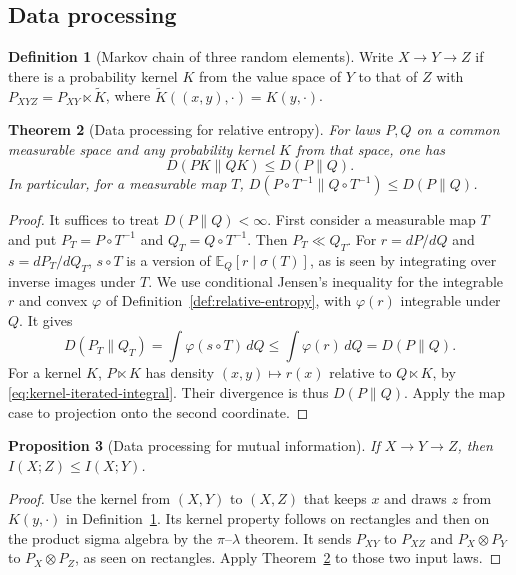 \documentclass[11pt,oneside]{book}
\newtheorem{theorem}{Theorem}[chapter]
\newtheorem{proposition}[theorem]{Proposition}
\theoremstyle{definition}
\newtheorem{definition}[theorem]{Definition}
\theoremstyle{remark}
\begin{document}
\subsection{Data processing}
\label{subsec:information-data-processing}

\begin{definition}[Markov chain of three random elements]
\label{def:markov-chain-three}
Write $X\to Y\to Z$ if there is a probability kernel $K$ from the
value space of $Y$ to that of $Z$ with
$P_{XYZ}=P_{XY}\ltimes\widetilde K$, where
$\widetilde K((x,y),\cdot)=K(y,\cdot)$.
\end{definition}

\begin{theorem}[Data processing for relative entropy]
\label{thm:relative-entropy-data-processing}
For laws $P,Q$ on a common measurable space and any probability
kernel $K$ from that space, one has
\[
D(PK\|QK)\leq D(P\|Q).
\]
In particular, for a measurable map $T$,
$D(P\circ T^{-1}\|Q\circ T^{-1})\leq D(P\|Q)$.
\end{theorem}
\begin{proof}
It suffices to treat $D(P\|Q)<\infty$. First consider a measurable
map $T$ and put $P_T=P\circ T^{-1}$ and $Q_T=Q\circ T^{-1}$.
Then $P_T\ll Q_T$. For $r=dP/dQ$ and $s=dP_T/dQ_T$,
$s\circ T$ is a version of $\mathbb E_Q[r\mid\sigma(T)]$, as is
seen by integrating over inverse images under $T$. We use
conditional Jensen's inequality for the integrable $r$ and
convex $\varphi$ of Definition~\ref{def:relative-entropy},
with $\varphi(r)$ integrable under $Q$. It gives
\[
D(P_T\|Q_T)=\int\varphi(s\circ T)\,dQ
\leq\int\varphi(r)\,dQ=D(P\|Q).
\]
For a kernel $K$, $P\ltimes K$ has density $(x,y)\mapsto r(x)$
relative to $Q\ltimes K$, by \eqref{eq:kernel-iterated-integral}.
Their divergence is thus $D(P\|Q)$. Apply the map case to projection
onto the second coordinate.
\end{proof}

\begin{proposition}[Data processing for mutual information]
\label{prop:mutual-information-data-processing}
If $X\to Y\to Z$, then $I(X;Z)\leq I(X;Y)$.
\end{proposition}
\begin{proof}
Use the kernel from $(X,Y)$ to $(X,Z)$ that keeps $x$ and draws
$z$ from $K(y,\cdot)$ in Definition~\ref{def:markov-chain-three}.
Its kernel property follows on rectangles and then on the product
sigma algebra by the $\pi$--$\lambda$ theorem. It sends $P_{XY}$
to $P_{XZ}$ and $P_X\otimes P_Y$ to $P_X\otimes P_Z$, as
seen on rectangles. Apply Theorem~\ref{thm:relative-entropy-data-processing}
to those two input laws.
\end{proof}
\end{document}
